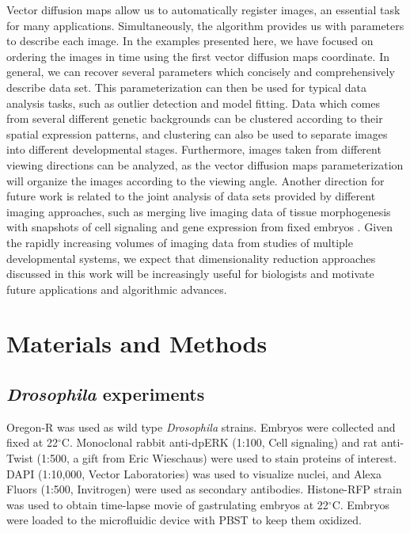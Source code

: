 \documentclass[twocolumn, 10pt]{article}
\begin{document}
Vector diffusion maps allow us to automatically register images, an essential task for many applications.
%
Simultaneously, the algorithm provides us with parameters to describe each image.
%
In the examples presented here, we have focused on ordering the images in time using the first vector diffusion maps coordinate.
%
In general, we can recover several parameters which concisely and comprehensively describe data set.
%
This parameterization can then be used for typical data analysis tasks, such as outlier detection and model fitting.
%
Data which comes from several different genetic backgrounds can be clustered according to their spatial expression patterns, and clustering can also be used to separate images into different developmental stages. 
%
Furthermore, images taken from different viewing directions can be analyzed, as the vector diffusion maps parameterization will organize the images according to the viewing angle.
%
Another direction for future work is related to the joint analysis of data sets provided by different imaging approaches, such as merging live imaging data of tissue morphogenesis with snapshots of cell signaling and gene expression from fixed embryos \citep{krzic2012multiview, ichikawa2014live, rubel2010coupling}.  
%
Given the rapidly increasing volumes of imaging data from studies of multiple developmental systems, we expect that dimensionality reduction approaches discussed in this work will be increasingly useful for biologists and motivate future applications and algorithmic advances. 
  





\section*{Materials and Methods}

\subsection*{{\em Drosophila} experiments}
%
Oregon-R was used as wild type {\em Drosophila} strains. 
%
Embryos were collected and fixed at 22$^\circ$C. 
%
Monoclonal rabbit anti-dpERK (1:100, Cell signaling) and rat anti-Twist (1:500, a gift from Eric Wieschaus) were used to stain proteins of interest. 
%
DAPI (1:10,000, Vector Laboratories) was used to visualize nuclei, and Alexa Fluors (1:500, Invitrogen) were used as secondary antibodies. 
%
Histone-RFP strain was used to obtain time-lapse movie of gastrulating embryos at 22$^\circ$C. 
%
Embryos were loaded to the microfluidic device with PBST to keep them oxidized. 
\end{document}
